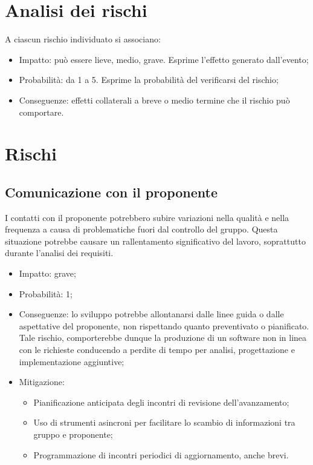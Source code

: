 \documentclass[a4paper, twoside]{article}
\begin{document}
\large

\newpage %



\section{Analisi dei rischi}

A ciascun rischio individuato si associano:
\begin{itemize}
    \item Impatto: può essere lieve, medio, grave. Esprime l'effetto generato dall'evento;
    \item Probabilità: da 1 a 5. Esprime la probabilità del verificarsi del rischio;
    \item Conseguenze: effetti collaterali a breve o medio termine che il rischio può comportare.
\end{itemize}

\section{Rischi}

\subsection{Comunicazione con il proponente}

I contatti con il proponente potrebbero subire variazioni nella qualità e nella frequenza a causa di problematiche fuori dal controllo del gruppo. Questa situazione potrebbe causare un rallentamento significativo del lavoro, soprattutto durante l'analisi dei requisiti.
\begin{itemize}
    \item Impatto: grave;

    \item Probabilità: 1;

    \item Conseguenze: lo sviluppo potrebbe allontanarsi dalle linee guida o dalle aspettative del proponente, non rispettando quanto preventivato o pianificato. Tale rischio, comporterebbe dunque la produzione di un software non in linea con le richieste conducendo a perdite di tempo per analisi, progettazione e implementazione aggiuntive;

    \item Mitigazione:
        \begin{itemize}
            \item Pianificazione anticipata degli incontri di revisione dell'avanzamento;
            \item Uso di strumenti asincroni per facilitare lo scambio di informazioni tra gruppo e proponente;
            \item Programmazione di incontri periodici di aggiornamento, anche brevi.
        \end{itemize}
\end{itemize}
\end{document}
